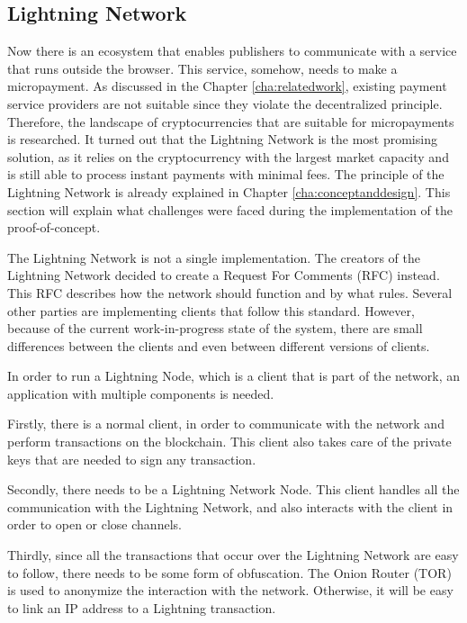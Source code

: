 \subsection{Lightning Network}
\label{sec:lightningnetwork}

Now there is an ecosystem that enables publishers to communicate with a service that runs outside the browser. This service, somehow, needs to make a micropayment. As discussed in the Chapter \ref{cha:relatedwork}, existing payment service providers are not suitable since they violate the decentralized principle. Therefore, the landscape of cryptocurrencies that are suitable for micropayments is researched. It turned out that the Lightning Network is the most promising solution, as it relies on the cryptocurrency with the largest market capacity and is still able to process instant payments with minimal fees. The principle of the Lightning Network is already explained in Chapter \ref{cha:conceptanddesign}. This section will explain what challenges were faced during the implementation of the proof-of-concept.

The Lightning Network is not a single implementation. The creators of the Lightning Network decided to create a Request For Comments (RFC) instead. This RFC describes how the network should function and by what rules. Several other parties are implementing clients that follow this standard. However, because of the current work-in-progress state of the system, there are small differences between the clients and even between different versions of clients. 

In order to run a Lightning Node, which is a client that is part of the network, an application with multiple components is needed. 

Firstly, there is a normal client, in order to communicate with the network and perform transactions on the blockchain. This client also takes care of the private keys that are needed to sign any transaction.

Secondly, there needs to be a Lightning Network Node. This client handles all the communication with the Lightning Network, and also interacts with the client in order to open or close channels. 

Thirdly, since all the transactions that occur over the Lightning Network are easy to follow, there needs to be some form of obfuscation. The Onion Router (TOR) \cite{mccoy2008shining} is used to anonymize the interaction with the network. Otherwise, it will be easy to link an IP address to a Lightning transaction.

